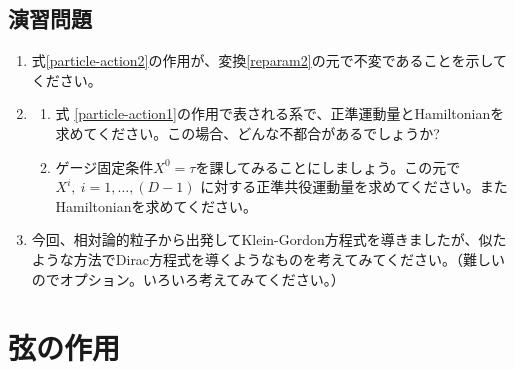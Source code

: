 \documentclass[report,paper=a4, fontsize=12pt, line_length=16cm, number_of_lines=34,dvipdfmx]{jlreq}
\numberwithin{equation}{chapter}
\numberwithin{equation}{section}
\begin{document}
\subsection*{演習問題}
\begin{enumerate}
 \item 式\eqref{particle-action2}の作用が、変換\eqref{reparam2}の元で不変であることを示してください。
 \item
\begin{enumerate}
 \item 式 \eqref{particle-action1}の作用で表される系で、正準運動量とHamiltonianを求めてください。この場合、どんな不都合があるでしょうか?
 \item ゲージ固定条件$X^{0}=\tau$を課してみることにしましょう。この元で$X^{i},\ i=1,\dots,(D-1)$ に対する正準共役運動量を求めてください。またHamiltonianを求めてください。
\end{enumerate}  
 \item 今回、相対論的粒子から出発してKlein-Gordon方程式を導きましたが、似たような方法でDirac方程式を導くようなものを考えてみてください。（難しいのでオプション。いろいろ考えてみてください。）
\end{enumerate}


\section{弦の作用}
\end{document}
